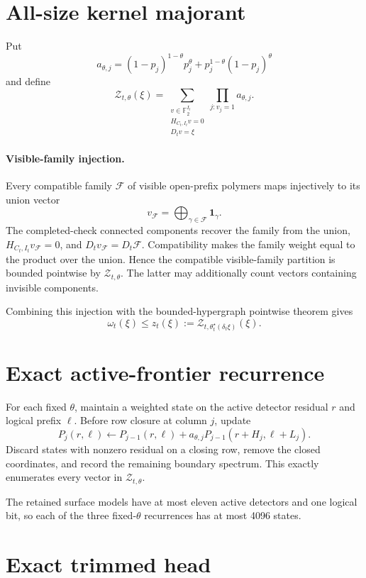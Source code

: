 \documentclass[11pt]{article}
\newcommand{\F}{\mathbb F}
\newcommand{\1}{\mathbf 1}
\begin{document}
\section{All-size kernel majorant}

Put
\[
 a_{\theta,j}=
 (1-p_j)^{1-\theta}p_j^\theta+
 p_j^{1-\theta}(1-p_j)^\theta
\]
and define
\[
 \mathcal Z_{t,\theta}(\xi)=
 \sum_{\substack{
 v\in\F_2^{I_t}\\
 H_{C_t,I_t}v=0\\
 D_tv=\xi}}
 \prod_{j:v_j=1}a_{\theta,j}.
\]

\paragraph{Visible-family injection.}
Every compatible family \(\mathcal F\) of visible open-prefix polymers maps
injectively to its union vector
\[
 v_{\mathcal F}=\bigoplus_{\gamma\in\mathcal F}\1_\gamma.
\]
The completed-check connected components recover the family from the union,
\(H_{C_t,I_t}v_{\mathcal F}=0\), and
\(D_tv_{\mathcal F}=D_t\mathcal F\).  Compatibility makes the family weight
equal to the product over the union.  Hence the compatible visible-family
partition is bounded pointwise by \(\mathcal Z_{t,\theta}\).
The latter may additionally count vectors containing invisible components.

Combining this injection with the bounded-hypergraph pointwise theorem gives
\[
 \omega_t(\xi)\le z_t(\xi):=
 \mathcal Z_{t,\theta_t^\star(\delta_t\xi)}(\xi).
\]

\section{Exact active-frontier recurrence}

For each fixed \(\theta\), maintain a weighted state on the active detector
residual \(r\) and logical prefix \(\ell\).  Before row closure at column
\(j\), update
\[
 P_j(r,\ell)\leftarrow
 P_{j-1}(r,\ell)+
 a_{\theta,j}P_{j-1}(r+H_j,\ell+L_j).
\]
Discard states with nonzero residual on a closing row, remove the closed
coordinates, and record the remaining boundary spectrum.  This exactly
enumerates every vector in \(\mathcal Z_{t,\theta}\).

The retained surface models have at most eleven active detectors and one
logical bit, so each of the three fixed-\(\theta\) recurrences has at most
4096 states.

\section{Exact trimmed head}
\end{document}

